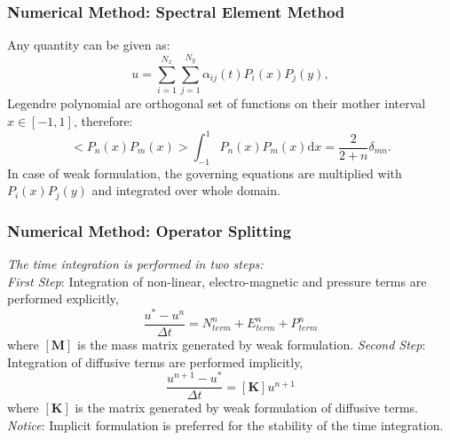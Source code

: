 \documentclass{fancyslides}
\begin{document}
\begin{frame}
 \frametitle{Numerical Method: Spectral Element Method}
Any quantity can be given as:
\begin{equation}
\label{eq:30}
u=\sum_{i=1}^{N_x}\sum_{j=1}^{N_y}\alpha_{ij}(t) P_i(x)P_{j}(y),
\end{equation}
Legendre polynomial are orthogonal set of functions on their mother interval $x\in[-1,1]$, therefore:
\begin{equation}
\label{eq:32}
<P_n(x)P_m(x)>\int_{-1}^{1}P_n(x)P_m(x)\mathrm{d}x=\frac{2}{2+n}\delta_{mn}.
\end{equation}
In case of weak formulation, the governing equations are multiplied with $P_i(x)P_j(y)$ and integrated over whole domain.
\end{frame}
\begin{frame}
 \frametitle{Numerical Method: Operator Splitting}
{ \Large \emph{ \color{blue} The time integration is performed in two steps:}}
\\
\emph{ \color{purple} First Step}: Integration of non-linear, electro-magnetic and pressure terms are performed explicitly,
 \begin{equation}
[\mathbf{M}]\frac{u^{*}-u^{n}}{\Delta t}=N_{term}^{n}+E_{term}^{n}+P_{term}^{n}
 \end{equation}
 where $[\mathbf{M}]$ is the mass matrix generated by weak formulation.
 \emph{ \color{purple} Second Step}: Integration of diffusive terms are performed implicitly,
 \begin{equation}
[\mathbf{M}]\frac{u^{n+1}-u^{*}}{\Delta t}=[\mathbf{K}]u^{n+1}
 \end{equation}
 where $[\mathbf{K}]$ is the matrix generated by weak formulation of diffusive terms.
 \\
\emph{ \color{purple} Notice}: Implicit formulation is preferred for the stability of the time integration.
\end{frame}
\end{document}

